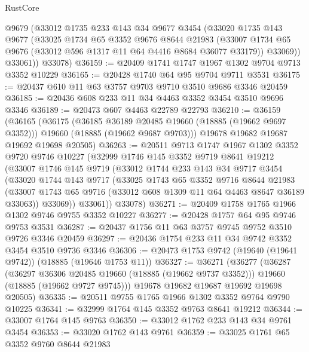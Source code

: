 \begin{lexlean}{RustCore}
\begin{coremodule}
        @9679
        (@33012
          @1735
          @233
          @143
          @34
          @9677
          @3454
          (@33020
            @1735
            @143
            @9677
            (@33025
              @1734
              @65
              @3352
              @9676
              @8644
              @21983
              (@33007 @1734 @65 @9676 (@33012 @596 @1317 @11 @64 @4416 @8684 @36077 @33179))
              @33069))
          @33061))
      @33078)
@36159 := @20409 @1741 @1747 @1967 @1302 @9704 @9713 @3352 @10229
@36165 := @20428 @1740 @64 @95 @9704 @9711 @3531
@36175 := @20437 @610 @11 @63 @3757 @9703 @9710 @3510 @9686 @3346 @20459
@36185 := @20436 @608 @233 @11 @34 @4463 @3352 @3454 @3510 @9696 @3346
@36189 := @20473 @607 @4463 @22789 @22793
@36210 := @36159
    (@36165
      (@36175
        (@36185 @36189 @20485 @19660 (@18885 (@19662 @9697 @3352)))
        @19660
        (@18885 (@19662 @9687 @9703)))
      @19678
      @19682
      @19687
      @19692
      @19698
      @20505)
@36263 := @20511
    @9713
    @1747
    @1967
    @1302
    @3352
    @9720
    @9746
    @10227
    (@32999
      @1746
      @145
      @3352
      @9719
      @8641
      @19212
      (@33007
        @1746
        @145
        @9719
        (@33012
          @1744
          @233
          @143
          @34
          @9717
          @3454
          (@33020
            @1744
            @143
            @9717
            (@33025
              @1743
              @65
              @3352
              @9716
              @8644
              @21983
              (@33007 @1743 @65 @9716 (@33012 @608 @1309 @11 @64 @4463 @8647 @36189 @33063))
              @33069))
          @33061))
      @33078)
@36271 := @20409 @1758 @1765 @1966 @1302 @9746 @9755 @3352 @10227
@36277 := @20428 @1757 @64 @95 @9746 @9753 @3531
@36287 := @20437 @1756 @11 @63 @3757 @9745 @9752 @3510 @9726 @3346 @20459
@36297 := @20436 @1754 @233 @11 @34 @9742 @3352 @3454 @3510 @9736 @3346
@36306 := @20473 @1753 @9742 (@19640 (@19641 @9742)) (@18885 (@19646 @1753 @11))
@36327 := @36271
    (@36277
      (@36287
        (@36297 @36306 @20485 @19660 (@18885 (@19662 @9737 @3352)))
        @19660
        (@18885 (@19662 @9727 @9745)))
      @19678
      @19682
      @19687
      @19692
      @19698
      @20505)
@36335 := @20511 @9755 @1765 @1966 @1302 @3352 @9764 @9790 @10225
@36341 := @32999 @1764 @145 @3352 @9763 @8641 @19212
@36344 := @33007 @1764 @145 @9763
@36350 := @33012 @1762 @233 @143 @34 @9761 @3454
@36353 := @33020 @1762 @143 @9761
@36359 := @33025 @1761 @65 @3352 @9760 @8644 @21983

\end{coremodule}
\end{lexlean}
